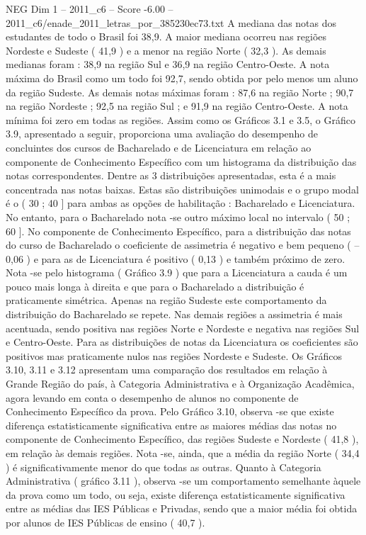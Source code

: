 \begin{textsample}{NEG Dim 1 – 2011\_c6 – Score -6.00 – 2011\_c6/enade\_2011\_letras\_por\_385230ec73.txt}
A mediana das notas dos estudantes de todo o Brasil foi 38,9.
A maior mediana ocorreu nas regiões Nordeste e Sudeste ( 41,9 ) e a menor na região Norte ( 32,3 ).
As demais medianas foram : 38,9 na região Sul e 36,9 na região Centro-Oeste.
A nota máxima do Brasil como um todo foi 92,7, sendo obtida por pelo menos um aluno da região Sudeste.
As demais notas máximas foram : 87,6 na região Norte ; 90,7 na região Nordeste ; 92,5 na região Sul ; e 91,9 na região Centro-Oeste.
A nota mínima foi zero em todas as regiões.
Assim como os Gráficos 3.1 e 3.5, o Gráfico 3.9, apresentado a seguir, proporciona uma avaliação do desempenho de concluintes dos cursos de Bacharelado e de Licenciatura em relação ao componente de Conhecimento Específico com um histograma da distribuição das notas correspondentes.
Dentre as 3 distribuições apresentadas, esta é a mais concentrada nas notas baixas.
Estas são distribuições unimodais e o grupo modal é o ( 30 ; 40 ] para ambas as opções de habilitação : Bacharelado e Licenciatura.
No entanto, para o Bacharelado nota -se outro máximo local no intervalo ( 50 ; 60 ].
No componente de Conhecimento Específico, para a distribuição das notas do curso de Bacharelado o coeficiente de assimetria é negativo e bem pequeno ( – 0,06 ) e para as de Licenciatura é positivo ( 0,13 ) e também próximo de zero.
Nota -se pelo histograma ( Gráfico 3.9 ) que para a Licenciatura a cauda é um pouco mais longa à direita e que para o Bacharelado a distribuição é praticamente simétrica.
Apenas na região Sudeste este comportamento da distribuição do Bacharelado se repete.
Nas demais regiões a assimetria é mais acentuada, sendo positiva nas regiões Norte e Nordeste e negativa nas regiões Sul e Centro-Oeste.
Para as distribuições de notas da Licenciatura os coeficientes são positivos mas praticamente nulos nas regiões Nordeste e Sudeste.
Os Gráficos 3.10, 3.11 e 3.12 apresentam uma comparação dos resultados em relação à Grande Região do país, à Categoria Administrativa e à Organização Acadêmica, agora levando em conta o desempenho de alunos no componente de Conhecimento Específico da prova.
Pelo Gráfico 3.10, observa -se que existe diferença estatisticamente significativa entre as maiores médias das notas no componente de Conhecimento Específico, das regiões Sudeste e Nordeste ( 41,8 ), em relação às demais regiões.
Nota -se, ainda, que a média da região Norte ( 34,4 ) é significativamente menor do que todas as outras.
Quanto à Categoria Administrativa ( gráfico 3.11 ), observa -se um comportamento semelhante àquele da prova como um todo, ou seja, existe diferença estatisticamente significativa entre as médias das IES Públicas e Privadas, sendo que a maior média foi obtida por alunos de IES Públicas de ensino ( 40,7 ).

\end{textsample}

